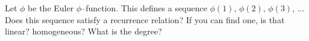 \starprob
Let $\phi$ be the Euler $\phi$--function.
This defines a sequence
$\phi(1)$, 
$\phi(2)$, 
$\phi(3)$, ...
Does this sequence satisfy a recurrence relation?
If you can find one, is that linear? homogeneous? What is the degree?
